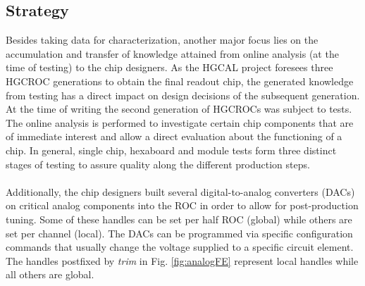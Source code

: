 \documentclass[../../main.tex]{subfiles}
\begin{document}
\subsection{Strategy}\label{sec:strategy}
Besides taking data for characterization, another major focus lies on the accumulation and transfer of knowledge attained from online analysis (at the time of testing) to the chip designers. As the HGCAL project foresees three HGCROC generations to obtain the final readout chip, the generated knowledge from testing has a direct impact on design decisions of the subsequent generation. At the time of writing the second generation of HGCROCs was subject to tests. The online analysis is performed to investigate certain chip components that are of immediate interest and allow a direct evaluation about the functioning of a chip. In general, single chip, hexaboard and module tests form three distinct stages of testing to assure quality along the different production steps.\\
\\
Additionally, the chip designers built several digital-to-analog converters (DACs) on critical analog components into the ROC in order to allow for post-production tuning. Some of these handles can be set per half ROC (global) while others are set per channel (local). The DACs can be programmed via specific configuration commands that usually change the voltage supplied to a specific circuit element. The handles postfixed by \textit{trim} in Fig. \ref{fig:analogFE} represent local handles while all others are global.
\end{document}
